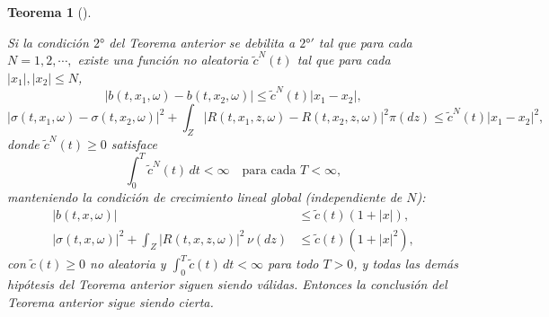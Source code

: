 \documentclass[
  spanish,
  us-letterpaper,
]{scrreprt}
\theoremstyle{plain}
\newtheorem{theorem}{Teorema}[chapter]
\theoremstyle{plain}
\theoremstyle{definition}
\theoremstyle{remark}
\begin{document}
\begin{theorem}[]\protect\hypertarget{thm-exis_uni_local_fuerte_SDE}{}\label{thm-exis_uni_local_fuerte_SDE}

Si la condición \(2°\) del Teorema anterior se debilita a \(2°'\) tal
que para cada \(N = 1, 2,\cdots,\) existe una función no aleatoria
\(\widetilde{c}^N(t)\) tal que para cada \(|x_1|, |x_2| \leq N\),
\[|b(t, x_1, \omega) - b(t, x_2, \omega)| \leq \widetilde{c}^N(t) |x_1 - x_2|,\]
\[|\sigma(t, x_1, \omega) - \sigma(t, x_2, \omega)|^2 + \int_Z |R(t, x_1, z, \omega) - R(t, x_2, z, \omega)|^2 \pi(dz)
        \leq \widetilde{c}^N(t) |x_1 - x_2|^2,\] donde
\(\widetilde{c}^N(t) \geq 0\) satisface
\[\int_0^T \widetilde{c}^N(t)\,dt < \infty \quad \text{para cada } T < \infty,\]
manteniendo la condición de crecimiento lineal global (independiente de
\(N\)): \begin{align*}
    |b(t,x,\omega)| &\leq \tilde{c}(t)(1 + |x|), \\
    |\sigma(t,x,\omega)|^2 + \int_Z |R(t,x,z,\omega)|^2 \, \nu(dz) &\leq \tilde{c}(t)(1 + |x|^2),
\end{align*} con \(\tilde{c}(t) \geq 0\) no aleatoria y
\(\int_0^T \tilde{c}(t)\,dt < \infty\) para todo \(T > 0\), y todas las
demás hipótesis del Teorema anterior siguen siendo válidas. Entonces la
conclusión del Teorema anterior sigue siendo cierta.

\end{theorem}
\end{document}
